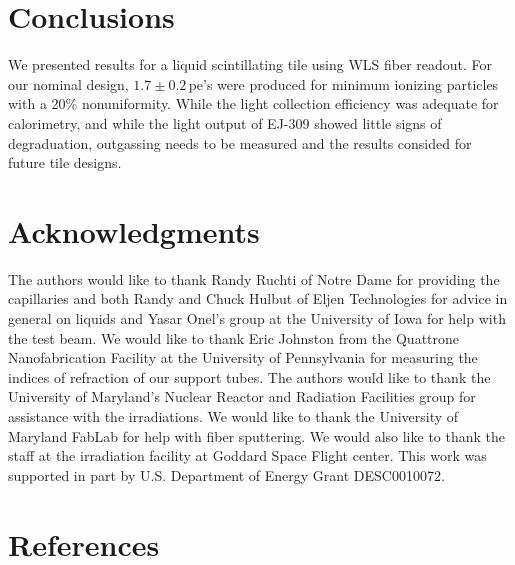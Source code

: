 \documentclass[review]{elsarticle}
\begin{document}
\section{Conclusions}

We presented results for a liquid scintillating tile using WLS fiber readout. For our nominal design, $1.7\pm 0.2$\,pe's
were produced for minimum ionizing particles with a 20\% nonuniformity.
While the light collection efficiency was adequate for calorimetry, and while the light output of EJ-309 showed little signs of degraduation, outgassing needs to be measured and the results consided for future tile designs.

\section{Acknowledgments}
The authors would like to thank Randy Ruchti of Notre Dame for
providing the capillaries and both Randy and Chuck Hulbut of Eljen
Technologies for
advice in general on liquids and
Yasar Onel's group at the University of
Iowa for help with the test beam. We would like to thank Eric
Johnston from the Quattrone Nanofabrication Facility at the University
of Pennsylvania for measuring the indices of refraction of our support
tubes. 
The authors would like to thank 
the University of Maryland's Nuclear Reactor and Radiation
Facilities group for assistance
with the irradiations.
 We would like to thank the University of Maryland
FabLab for help with fiber sputtering.
We would also like to thank the staff at the irradiation facility at Goddard Space Flight center.
This work was supported in part by U.S. Department of Energy
Grant DESC0010072.

\section*{References}


\end{document}
